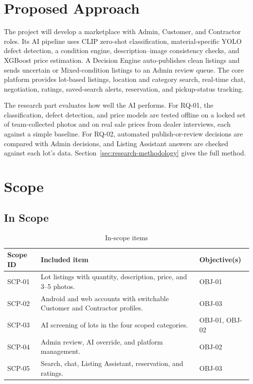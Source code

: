 \section{Proposed Approach}
The project will develop a marketplace with Admin, Customer, and Contractor
roles. Its AI pipeline uses CLIP zero-shot classification, material-specific YOLO
defect detection, a condition engine, description--image consistency checks, and
XGBoost price estimation. A Decision Engine auto-publishes clean listings and
sends uncertain or Mixed-condition listings to an Admin review queue. The core
platform provides lot-based listings, location and category search, real-time
chat, negotiation, ratings, saved-search alerts, reservation, and pickup-status
tracking.

The research part evaluates how well the AI performs. For RQ-01, the classification,
defect detection, and price models are tested offline on a locked set of team-collected
photos and on real sale prices from dealer interviews, each against a simple baseline.
For RQ-02, automated publish-or-review decisions are compared with Admin decisions, and
Listing Assistant answers are checked against each lot's data.
Section~\ref{sec:research-methodology} gives the full method.

\section{Scope}
\subsection{In Scope}

\begin{table}[H]
\centering
\caption{In-scope items}
\label{tab:in-scope}
\begin{tabularx}{\textwidth}{@{}p{}X p{}@{}}
\toprule
\textbf{Scope ID} & \textbf{Included item} & \textbf{Objective(s)} \\
\midrule
SCP-01 & Lot listings with quantity, description, price, and 3--5 photos. & OBJ-01 \\
SCP-02 & Android and web accounts with switchable Customer and Contractor profiles. & OBJ-03 \\
SCP-03 & AI screening of lots in the four scoped categories. & OBJ-01, OBJ-02 \\
SCP-04 & Admin review, AI override, and platform management. & OBJ-02 \\
SCP-05 & Search, chat, Listing Assistant, reservation, and ratings. & OBJ-03 \\
\bottomrule
\end{tabularx}
\end{table}

